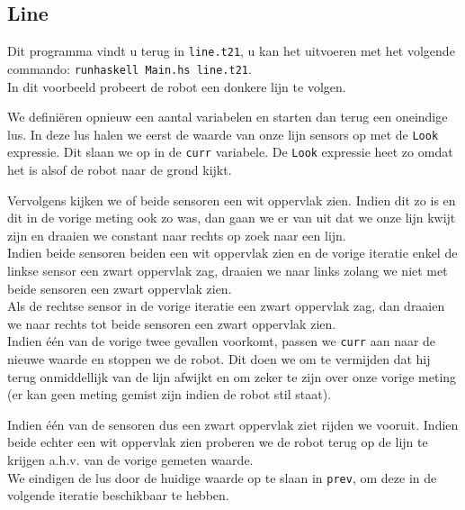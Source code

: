 \documentclass[a4paper]{article}
\begin{document}
\subsection*{Line}
Dit programma vindt u terug in \verb|line.t21|, u kan het uitvoeren met het volgende commando: \verb|runhaskell Main.hs line.t21|.\\
In dit voorbeeld probeert de robot een donkere lijn te volgen.
\par We defini\"eren opnieuw een aantal variabelen en starten dan terug een oneindige lus. In deze lus halen we eerst de waarde van onze lijn sensors op met de \verb|Look| expressie. Dit slaan we op in de \verb|curr| variabele. De \verb|Look| expressie heet zo omdat het is alsof de robot naar de grond kijkt.

\par Vervolgens kijken we of beide sensoren een wit oppervlak zien. Indien dit zo is en dit in de vorige meting ook zo was, dan gaan we er van uit dat we onze lijn kwijt zijn en draaien we constant naar rechts op zoek naar een lijn.\\
Indien beide sensoren beiden een wit oppervlak zien en de vorige iteratie enkel de linkse sensor een zwart oppervlak zag, draaien we naar links zolang we niet met beide sensoren een zwart oppervlak zien.\\
Als de rechtse sensor in de vorige iteratie een zwart oppervlak zag, dan draaien we naar rechts tot beide sensoren een zwart oppervlak zien.\\
Indien \'e\'en van de vorige twee gevallen voorkomt, passen we \verb|curr| aan naar de nieuwe waarde en stoppen we de robot. Dit doen we om te vermijden dat hij terug onmiddellijk van de lijn afwijkt en om zeker te zijn over onze vorige meting (er kan geen meting gemist zijn indien de robot stil staat).\\

\par Indien \'e\'en van de sensoren dus een zwart oppervlak ziet rijden we vooruit. Indien beide echter een wit oppervlak zien proberen we de robot terug op de lijn te krijgen a.h.v. van de vorige gemeten waarde.\\
We eindigen de lus door de huidige waarde op te slaan in \verb|prev|, om deze in de volgende iteratie beschikbaar te hebben.

\end{document}
